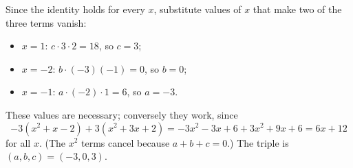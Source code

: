 Since the identity holds for every $x$, substitute values of $x$ that make two of the three terms vanish:
\begin{itemize}
\item $x=1$: $c\cdot3\cdot2=18$, so $c=3$;
\item $x=-2$: $b\cdot(-3)(-1)=0$, so $b=0$;
\item $x=-1$: $a\cdot(-2)\cdot1=6$, so $a=-3$.
\end{itemize}
These values are necessary; conversely they work, since
\[-3(x^2+x-2)+3(x^2+3x+2)=-3x^2-3x+6+3x^2+9x+6=6x+12\]
for all $x$. (The $x^2$ terms cancel because $a+b+c=0$.) The triple is $\boxed{(a,b,c)=(-3,0,3)}$.
